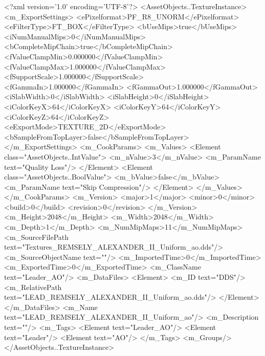 <?xml version='1.0' encoding='UTF-8'?>
<AssetObjects..TextureInstance>
  <m_ExportSettings>
    <ePixelformat>PF_R8_UNORM</ePixelformat>
    <eFilterType>FT_BOX</eFilterType>
    <bUseMips>true</bUseMips>
    <iNumManualMips>0</iNumManualMips>
    <bCompleteMipChain>true</bCompleteMipChain>
    <fValueClampMin>0.000000</fValueClampMin>
    <fValueClampMax>1.000000</fValueClampMax>
    <fSupportScale>1.000000</fSupportScale>
    <fGammaIn>1.000000</fGammaIn>
    <fGammaOut>1.000000</fGammaOut>
    <iSlabWidth>0</iSlabWidth>
    <iSlabHeight>0</iSlabHeight>
    <iColorKeyX>64</iColorKeyX>
    <iColorKeyY>64</iColorKeyY>
    <iColorKeyZ>64</iColorKeyZ>
    <eExportMode>TEXTURE_2D</eExportMode>
    <bSampleFromTopLayer>false</bSampleFromTopLayer>
  </m_ExportSettings>
  <m_CookParams>
    <m_Values>
      <Element class="AssetObjects..IntValue">
        <m_nValue>3</m_nValue>
        <m_ParamName text="Quality Loss"/>
      </Element>
      <Element class="AssetObjects..BoolValue">
        <m_bValue>false</m_bValue>
        <m_ParamName text="Skip Compression"/>
      </Element>
    </m_Values>
  </m_CookParams>
  <m_Version>
    <major>1</major>
    <minor>0</minor>
    <build>0</build>
    <revision>0</revision>
  </m_Version>
  <m_Height>2048</m_Height>
  <m_Width>2048</m_Width>
  <m_Depth>1</m_Depth>
  <m_NumMipMaps>11</m_NumMipMaps>
  <m_SourceFilePath text="Textures\LEAD_REMSELY_ALEXANDER_II_Uniform_ao.dds"/>
  <m_SourceObjectName text=""/>
  <m_ImportedTime>0</m_ImportedTime>
  <m_ExportedTime>0</m_ExportedTime>
  <m_ClassName text="Leader_AO"/>
  <m_DataFiles>
    <Element>
      <m_ID text="DDS"/>
      <m_RelativePath text="LEAD_REMSELY_ALEXANDER_II_Uniform_ao.dds"/>
    </Element>
  </m_DataFiles>
  <m_Name text="LEAD_REMSELY_ALEXANDER_II_Uniform_ao"/>
  <m_Description text=""/>
  <m_Tags>
    <Element text="Leader_AO"/>
    <Element text="Leader"/>
    <Element text="AO"/>
  </m_Tags>
  <m_Groups/>
</AssetObjects..TextureInstance>

